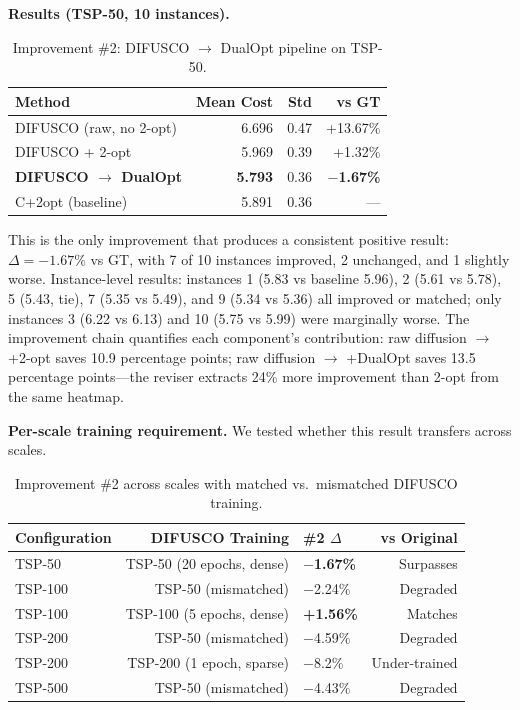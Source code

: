 \documentclass[11pt,a4paper]{article}
\begin{document}
\textbf{Results (TSP-50, 10 instances).}

\begin{table}[H]
\centering
\footnotesize
\caption{Improvement \#2: DIFUSCO $\rightarrow$ DualOpt pipeline on TSP-50.}
\begin{tabular}{@{}lrrr@{}}
\toprule
Method & Mean Cost & Std & vs GT \\
\midrule
DIFUSCO (raw, no 2-opt) & 6.696 & 0.47 & +13.67\% \\
DIFUSCO + 2-opt & 5.969 & 0.39 & +1.32\% \\
\textbf{DIFUSCO $\rightarrow$ DualOpt} & \textbf{5.793} & 0.36 & \textbf{$-$1.67\%} \\
C+2opt (baseline) & 5.891 & 0.36 & --- \\
\bottomrule
\end{tabular}
\end{table}

This is the only improvement that produces a consistent positive result: $\Delta = -1.67\%$ vs GT, with 7 of 10 instances improved, 2 unchanged, and 1 slightly worse. Instance-level results: instances 1 (5.83 vs baseline 5.96), 2 (5.61 vs 5.78), 5 (5.43, tie), 7 (5.35 vs 5.49), and 9 (5.34 vs 5.36) all improved or matched; only instances 3 (6.22 vs 6.13) and 10 (5.75 vs 5.99) were marginally worse. The improvement chain quantifies each component's contribution: raw diffusion $\rightarrow$ +2-opt saves 10.9 percentage points; raw diffusion $\rightarrow$ +DualOpt saves 13.5 percentage points---the reviser extracts 24\% more improvement than 2-opt from the same heatmap.

\textbf{Per-scale training requirement.} We tested whether this result transfers across scales.

\begin{table}[H]
\centering
\footnotesize
\caption{Improvement \#2 across scales with matched vs.\ mismatched DIFUSCO training.}
\begin{tabular}{@{}lrlr@{}}
\toprule
Configuration & DIFUSCO Training & \#2 $\Delta$ & vs Original \\
\midrule
TSP-50 & TSP-50 (20 epochs, dense) & \textbf{$-$1.67\%} & Surpasses \\
TSP-100 & TSP-50 (mismatched) & $-$2.24\% & Degraded \\
TSP-100 & TSP-100 (5 epochs, dense) & \textbf{+1.56\%} & Matches \\
TSP-200 & TSP-50 (mismatched) & $-$4.59\% & Degraded \\
TSP-200 & TSP-200 (1 epoch, sparse) & $-$8.2\% & Under-trained \\
TSP-500 & TSP-50 (mismatched) & $-$4.43\% & Degraded \\
\bottomrule
\end{tabular}
\end{table}
\end{document}
